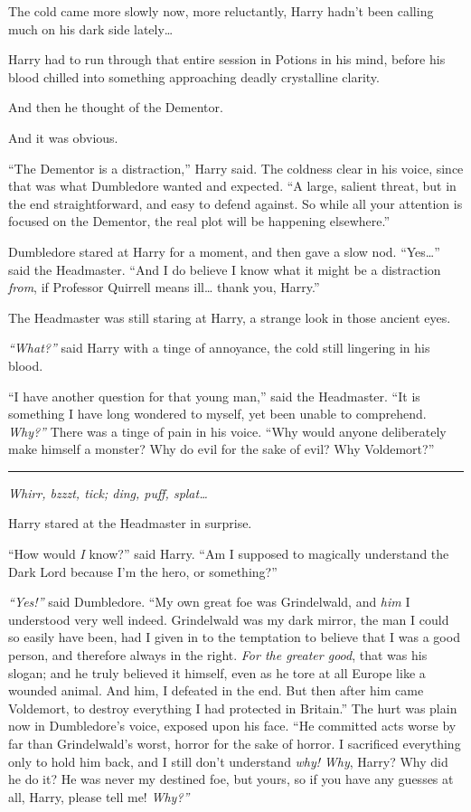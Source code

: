 The cold came more slowly now, more reluctantly, Harry hadn't been
calling much on his dark side lately\ldots{}

Harry had to run through that entire session in Potions in his mind,
before his blood chilled into something approaching deadly crystalline
clarity.

And then he thought of the Dementor.

And it was obvious.

``The Dementor is a distraction,'' Harry said. The coldness clear in his
voice, since that was what Dumbledore wanted and expected. ``A large,
salient threat, but in the end straightforward, and easy to defend
against. So while all your attention is focused on the Dementor, the
real plot will be happening elsewhere.''

Dumbledore stared at Harry for a moment, and then gave a slow nod.
``Yes\ldots{}'' said the Headmaster. ``And I do believe I know what it
might be a distraction \emph{from}, if Professor Quirrell means
ill\ldots{} thank you, Harry.''

The Headmaster was still staring at Harry, a strange look in those
ancient eyes.

\emph{``What?''} said Harry with a tinge of annoyance, the cold still
lingering in his blood.

``I have another question for that young man,'' said the Headmaster.
``It is something I have long wondered to myself, yet been unable to
comprehend. \emph{Why?''} There was a tinge of pain in his voice. ``Why
would anyone deliberately make himself a monster? Why do evil for the
sake of evil? Why Voldemort?''

\begin{center}\rule{3in}{0.4pt}\end{center}

\emph{Whirr, bzzzt, tick; ding, puff, splat\ldots{}}

Harry stared at the Headmaster in surprise.

``How would \emph{I} know?'' said Harry. ``Am I supposed to magically
understand the Dark Lord because I'm the hero, or something?''

\emph{``Yes!''} said Dumbledore. ``My own great foe was Grindelwald, and
\emph{him} I understood very well indeed. Grindelwald was my dark
mirror, the man I could so easily have been, had I given in to the
temptation to believe that I was a good person, and therefore always in
the right. \emph{For the greater good}, that was his slogan; and he
truly believed it himself, even as he tore at all Europe like a wounded
animal. And him, I defeated in the end. But then after him came
Voldemort, to destroy everything I had protected in Britain.'' The hurt
was plain now in Dumbledore's voice, exposed upon his face. ``He
committed acts worse by far than Grindelwald's worst, horror for the
sake of horror. I sacrificed everything only to hold him back, and I
still don't understand \emph{why!} \emph{Why}, Harry? Why did he do it?
He was never my destined foe, but yours, so if you have any guesses at
all, Harry, please tell me! \emph{Why?''}

